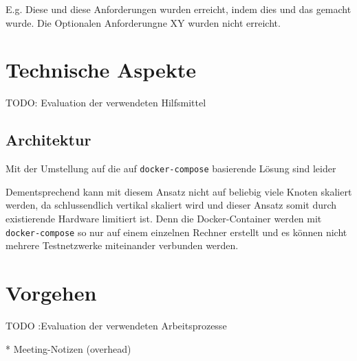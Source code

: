 
E.g. Diese und diese Anforderungen wurden erreicht, indem dies und das gemacht wurde.
Die Optionalen Anforderungne XY wurden nicht erreicht.

\section{Technische Aspekte}
TODO: Evaluation der verwendeten Hilfsmittel

\subsection{Architektur}

Mit der Umstellung auf die auf \lstinline|docker-compose| basierende Lösung sind leider 


Dementsprechend kann mit diesem Ansatz nicht auf beliebig viele Knoten skaliert werden, da schlussendlich vertikal skaliert wird und dieser Ansatz somit durch existierende Hardware limitiert ist.
Denn die Docker-Container werden mit \lstinline|docker-compose| so nur auf einem einzelnen Rechner erstellt und es können nicht mehrere Testnetzwerke miteinander verbunden werden.

\section{Vorgehen}

TODO :Evaluation der verwendeten Arbeitsprozesse

* Meeting-Notizen (overhead)
